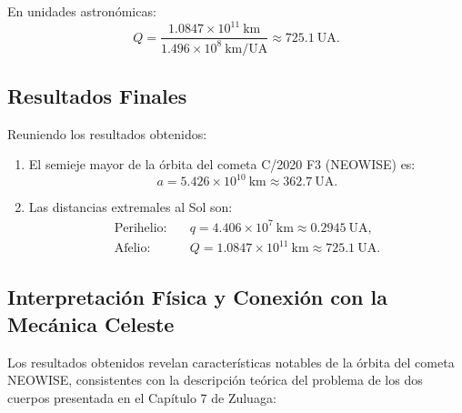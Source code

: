 \documentclass[12pt, a4paper]{article}
\begin{document}
En unidades astronómicas:
$$Q = \frac{1.0847 \times 10^{11}~\text{km}}{1.496 \times 10^8~\text{km/UA}} \approx 725.1~\text{UA}.$$

\subsection*{Resultados Finales}

Reuniendo los resultados obtenidos:

\begin{enumerate}
    \item[\textbf{a)}] El semieje mayor de la órbita del cometa C/2020 F3 (NEOWISE) es:
    $$\boxed{a = 5.426 \times 10^{10}~\text{km} \approx 362.7~\text{UA}}.$$
    
    \item[\textbf{b)}] Las distancias extremales al Sol son:
    \begin{align*}
        \text{Perihelio:} \quad & \boxed{q = 4.406 \times 10^7~\text{km} \approx 0.2945~\text{UA}},\\
        \text{Afelio:} \quad & \boxed{Q = 1.0847 \times 10^{11}~\text{km} \approx 725.1~\text{UA}}.
    \end{align*}
\end{enumerate}

\subsection*{Interpretación Física y Conexión con la Mecánica Celeste}

Los resultados obtenidos revelan características notables de la órbita del cometa NEOWISE, consistentes con la descripción teórica del problema de los dos cuerpos presentada en el Capítulo 7 de Zuluaga:
\end{document}
